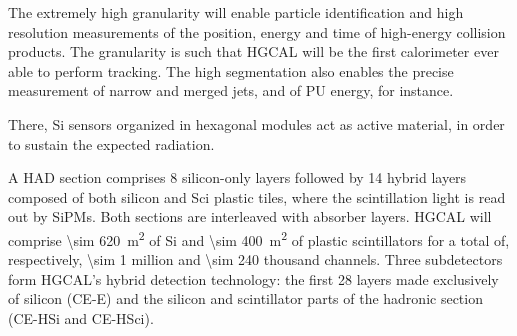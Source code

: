 \documentclass[11pt]{article}
\begin{document}
The extremely high granularity will enable particle identification and high resolution measurements of the position, energy and time of high-energy collision products.
The granularity is such that \ac{HGCAL} will be the first calorimeter ever able to perform tracking.
The high segmentation also enables the precise measurement of narrow and merged jets, and of \ac{PU} energy, for instance.

\cite{bruno_chep23}













There, \ac{Si} sensors organized in hexagonal modules act as active material, in order to sustain the expected radiation.
\cite{refCUDA1}

A \ac{HAD} section comprises \num{8} silicon-only layers followed by \num{14} hybrid layers composed of both silicon and \ac{Sci} plastic tiles, where the scintillation light is read out by \acp{SiPM}.
Both sections are interleaved with absorber layers.
\ac{HGCAL} will comprise \SI{\sim 620}{\meter\squared} of \ac{Si} and \SI{\sim 400}{\meter\squared} of plastic scintillators for a total of, respectively, \num{\sim 1} million and \num{\sim 240} thousand channels.
Three subdetectors form HGCAL’s hybrid detection technology: the first \num{28} layers made exclusively of silicon (\ac{CE-E}) and the silicon and scintillator parts of the hadronic section (CE-HSi and CE-HSci).
\end{document}
